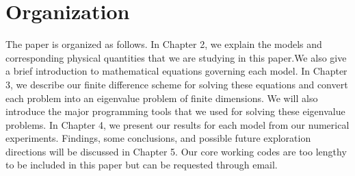 \section{Organization}

The paper is organized as follows. In Chapter 2, we explain the models and corresponding physical quantities that we are studying in this paper.We also give a brief introduction to mathematical equations governing each model.  In Chapter 3, we describe our finite difference scheme for solving these equations and convert each problem into an eigenvalue problem of finite dimensions. We will also introduce the major programming tools that we used for solving these eigenvalue problems. In Chapter 4, we present our results for each model from our numerical experiments. Findings, some conclusions, and possible future exploration directions will be discussed in Chapter 5. Our core working codes are too lengthy to be included in this paper but can be requested through email.  
\endinput
